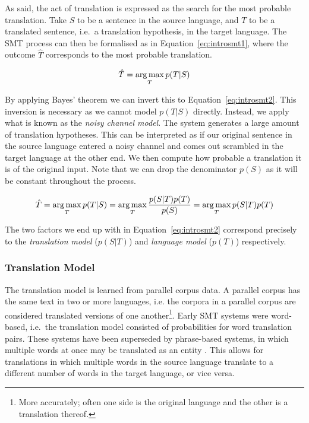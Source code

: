 As said, the act of translation is expressed as the search for the most
probable translation. Take $S$ to be a sentence in the source language, and $T$
to be a translated sentence, i.e.\ a translation hypothesis, in the target
language. The SMT process can then be formalised as in
Equation~\ref{eq:introsmt1}, where the outcome $\hat{T}$ corresponds to the most probable translation.

\begin{equation}
\hat{T} = \operatorname*{arg\,max}_T p(T|S)
\label{eq:introsmt1}
\end{equation}

By applying Bayes' theorem we can invert this to Equation~\ref{eq:introsmt2}.
This inversion is necessary as we cannot model $p(T|S)$ directly. Instead, we
apply what is known as the \emph{noisy channel model}. The system generates a
large amount of translation hypotheses. This can be interpreted as if our
original sentence in the source language entered a noisy channel and comes out
scrambled in the target language at the other end. We then compute how probable
a translation it is of the original input. Note that we can drop the
denominator $p(S)$ as it will be constant throughout the process.

\begin{equation}
\hat{T} = \operatorname*{arg\,max}_T p(T|S) = \operatorname*{arg\,max}_T \frac{p(S|T)p(T)}{p(S)} = \operatorname*{arg\,max}_T p(S|T)p(T)
\label{eq:introsmt2}
\end{equation}

The two factors we end up with in Equation~\ref{eq:introsmt2} correspond
precisely to the \emph{translation model} ($p(S|T)$) and \emph{language model}
($p(T)$) respectively.

\subsubsection{Translation Model}

The translation model is learned from parallel corpus data. A parallel corpus
has the same text in two or more languages, i.e. the corpora in a parallel corpus are considered translated versions of
one another\footnote{More accurately; often one side is the original language and the other is a translation thereof.}. Early SMT systems were word-based, i.e.\ the translation model
consisted of probabilities for word translation pairs. These systems have been
superseded by phrase-based systems, in which multiple words at once may be
translated as an entity \citep{PBSMT}. This allows for translations in which
multiple words in the source language translate to a different number of words in the target language, or vice versa.


